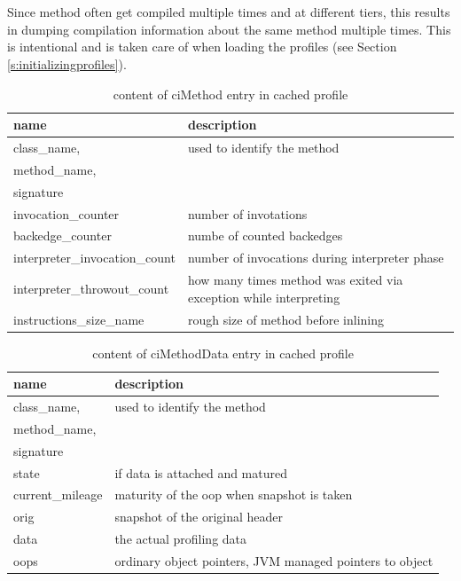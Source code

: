 \\\\
Since method often get compiled multiple times and at different tiers, this results in dumping compilation information about the same method multiple times. This is intentional and is taken care of when loading the profiles (see Section \ref{s:initializingprofiles}).
\begin{table}[ht!]
  \caption{content of ciMethod entry in cached profile}
  \label{t:cimethod}
  \begin{center}
    \begin{tabular}{|p{5cm}|p{10.5cm}|} 
      \hline
       \textbf{name} & \textbf{description} \\ \hline\hline
       class\_name,& used to identify the method\\
       method\_name, & \\
       signature & \\ \hline
       invocation\_counter & number of invotations\\ \hline
       backedge\_counter & numbe of counted backedges\\ \hline
       interpreter\_invocation\_count & number of invocations during interpreter phase\\ \hline
       interpreter\_throwout\_count & how many times method was exited via exception while interpreting\\ \hline
       instructions\_size\_name & rough size of method before inlining\\ \hline
    \end{tabular}
  \end{center}
\end{table}
\begin{table}[ht!]
  \caption{content of ciMethodData entry in cached profile}
  \label{t:cimethoddata}
  \begin{center}
    \begin{tabular}{|p{5cm}|p{10.5cm}|} 
      \hline
       \textbf{name} & \textbf{description} \\ \hline\hline
       class\_name,& used to identify the method\\
       method\_name, & \\
       signature & \\ \hline
       state & if data is attached and matured\\ \hline
       current\_mileage & maturity of the oop when snapshot is taken\\ \hline
       orig &  snapshot of the original header\\ \hline
       data & the actual profiling data\\ \hline
       oops & ordinary object pointers, JVM managed pointers to object\\ \hline        
    \end{tabular}
  \end{center}
\end{table}
